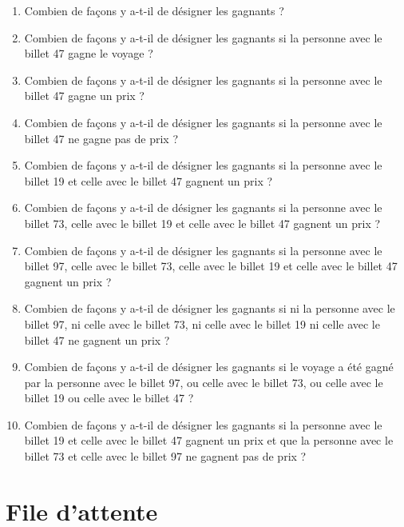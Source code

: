 \documentclass[a4paper,11pt]{article}
\begin{document}
\begin{enumerate}
\item Combien de façons y a-t-il de désigner les gagnants ?

\item Combien de façons y a-t-il de désigner les gagnants si la personne avec le billet 47 gagne le voyage ?

\item Combien de façons y a-t-il de désigner les gagnants si la personne avec le billet 47 gagne un prix ?

\item Combien de façons y a-t-il de désigner les gagnants si la personne avec le billet 47 ne gagne pas de prix ?

\item Combien de façons y a-t-il de désigner les gagnants si la personne avec le billet 19 et celle avec le billet 47 gagnent un prix ?

\item Combien de façons y a-t-il de désigner les gagnants si la personne avec le billet 73, celle avec le billet 19 et celle avec le billet 47 gagnent un prix ?

\item Combien de façons y a-t-il de désigner les gagnants si la personne avec le billet 97, celle avec le billet 73, celle avec le billet 19 et celle avec le billet 47 gagnent un prix ?

\item Combien de façons y a-t-il de désigner les gagnants si ni la personne avec le billet 97, ni celle avec le billet 73, ni celle avec le billet 19 ni celle avec le billet 47 ne gagnent un prix ?

\item Combien de façons y a-t-il de désigner les gagnants si le voyage a été gagné par la personne avec le billet 97, ou celle avec le billet 73, ou celle avec le billet 19 ou celle avec le billet 47 ?

\item Combien de façons y a-t-il de désigner les gagnants si la personne avec le billet 19 et celle avec le billet 47 gagnent un prix et que la personne avec le billet 73 et celle avec le billet 97 ne gagnent pas de prix ?
\end{enumerate}

\section{File d'attente}
\end{document}
